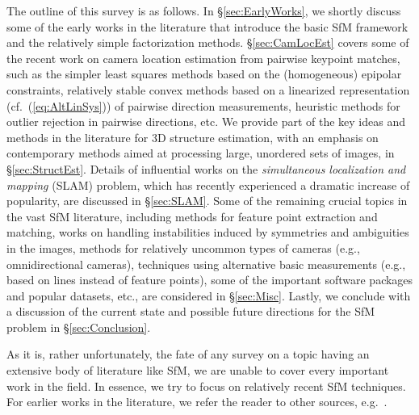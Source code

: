 \documentclass[10pt]{article}
\begin{document}
The outline of this survey is as follows. In \S\ref{sec:EarlyWorks}, we shortly discuss some of the early works in the literature that introduce the basic SfM framework and the relatively simple factorization methods. \S\ref{sec:CamLocEst} covers some of the recent work on camera location estimation from pairwise keypoint matches, such as the simpler least squares methods based on the (homogeneous) epipolar constraints, relatively stable convex methods based on a linearized representation (cf.~(\ref{eq:AltLinSys})) of pairwise direction measurements, heuristic methods for outlier rejection in pairwise directions, etc. We provide part of the key ideas and methods in the literature for $3$D structure estimation, with an emphasis on contemporary methods aimed at processing large, unordered sets of images, in \S\ref{sec:StructEst}. Details of influential works on the \emph{simultaneous localization and mapping} (SLAM) problem, which has recently experienced a dramatic increase of popularity, are discussed in \S\ref{sec:SLAM}. Some of the remaining crucial topics in the vast SfM literature, including methods for feature point extraction and matching, works on handling instabilities induced by symmetries and ambiguities in the images, methods for relatively uncommon types of cameras (e.g., omnidirectional cameras), techniques using alternative basic measurements (e.g., based on lines instead of feature points), some of the important software packages and popular datasets, etc., are considered in \S\ref{sec:Misc}. Lastly, we conclude with a discussion of the current state and possible future directions for the SfM problem in \S\ref{sec:Conclusion}.

As it is, rather unfortunately, the fate of any survey on a topic having an extensive body of literature like SfM, we are unable to cover every important work in the field. In essence, we try to focus on relatively recent SfM techniques. For earlier works in the literature, we refer the reader to other sources, e.g.~\cite{BundleAdjustment,HartleyBook,OliensisCritique}.
\end{document}
